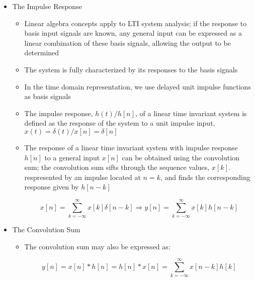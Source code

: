 \begin{itemize}

  \item The Impulse Response

    \begin{itemize}

      \item Linear algebra concepts apply to LTI system analysis; if the response to basis input signals are known, any general input can be expressed as a linear combination of these basis signals, allowing the output to be determined

      \item The system is fully characterized by its responses to the basis signals

      \item In the time domain representation, we use delayed unit impulse functions as basis signals

      \item The impulse response, $h(t)/h[n]$, of a linear time invariant system is defined as the response of the system to a unit impulse input, $x(t)=\delta(t)/x[n]=\delta[n]$

      \item The response of a linear time invariant system with impulse response $h[n]$ to a general input $x[n]$ can be obtained using the convolution sum; the convolution sum sifts through the sequence values, $x[k]$. respresented by an impulse located at $n=k$, and finds the corresponding response given by $h[n-k]$

        $$x[n]=\sum_{k=-\infty}^{\infty}x[k]\delta[n-k]\Longrightarrow y[n]=\sum_{k=-\infty}^{\infty}x[k]h[n-k]$$

    \end{itemize}

  \item The Convolution Sum

    \begin{itemize}

      \item The convolution sum may also be expressed as:

        $$y[n]=x[n]*h[n]=h[n]*x[n]=\sum_{k=-\infty}^{\infty}x[n-k]h[k]$$

    \end{itemize}

\end{itemize}



